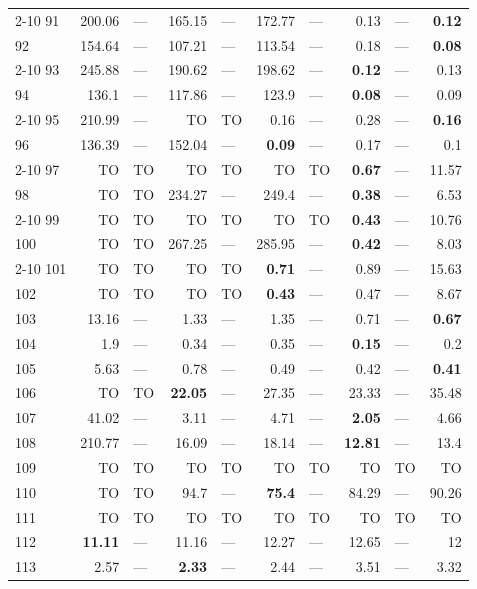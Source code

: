 \begin{longtable}{lr@{\hskip 4pt}l@{\hskip 12pt}r@{\hskip 4pt}l@{\hskip 12pt}r@{\hskip 4pt}l@{\hskip 12pt}r@{\hskip 4pt}l@{\hskip 12pt}r}
\cmidrule{2-10}
91 & 200.06 & --- & 165.15 & --- & 172.77 & --- & 0.13 & --- & \textbf{0.12} \\
92 & 154.64 & --- & 107.21 & --- & 113.54 & --- & 0.18 & --- & \textbf{0.08} \\
\cmidrule{2-10}
93 & 245.88 & --- & 190.62 & --- & 198.62 & --- & \textbf{0.12} & --- & 0.13 \\
94 & 136.1 & --- & 117.86 & --- & 123.9 & --- & \textbf{0.08} & --- & 0.09 \\
\cmidrule{2-10}
95 & 210.99 & --- & TO & TO & 0.16 & --- & 0.28 & --- & \textbf{0.16} \\
96 & 136.39 & --- & 152.04 & --- & \textbf{0.09} & --- & 0.17 & --- & 0.1 \\
\cmidrule{2-10}
97 & TO & TO & TO & TO & TO & TO & \textbf{0.67} & --- & 11.57 \\
98 & TO & TO & 234.27 & --- & 249.4 & --- & \textbf{0.38} & --- & 6.53 \\
\cmidrule{2-10}
99 & TO & TO & TO & TO & TO & TO & \textbf{0.43} & --- & 10.76 \\
100 & TO & TO & 267.25 & --- & 285.95 & --- & \textbf{0.42} & --- & 8.03 \\
\cmidrule{2-10}
101 & TO & TO & TO & TO & \textbf{0.71} & --- & 0.89 & --- & 15.63 \\
102 & TO & TO & TO & TO & \textbf{0.43} & --- & 0.47 & --- & 8.67 \\
\midrule
103 & 13.16 & --- & 1.33 & --- & 1.35 & --- & 0.71 & --- & \textbf{0.67} \\
104 & 1.9 & --- & 0.34 & --- & 0.35 & --- & \textbf{0.15} & --- & 0.2 \\
105 & 5.63 & --- & 0.78 & --- & 0.49 & --- & 0.42 & --- & \textbf{0.41} \\
106 & TO & TO & \textbf{22.05} & --- & 27.35 & --- & 23.33 & --- & 35.48 \\
107 & 41.02 & --- & 3.11 & --- & 4.71 & --- & \textbf{2.05} & --- & 4.66 \\
108 & 210.77 & --- & 16.09 & --- & 18.14 & --- & \textbf{12.81} & --- & 13.4 \\
109 & TO & TO & TO & TO & TO & TO & TO & TO & TO \\
110 & TO & TO & 94.7 & --- & \textbf{75.4} & --- & 84.29 & --- & 90.26 \\
111 & TO & TO & TO & TO & TO & TO & TO & TO & TO \\
112 & \textbf{11.11} & --- & 11.16 & --- & 12.27 & --- & 12.65 & --- & 12 \\
113 & 2.57 & --- & \textbf{2.33} & --- & 2.44 & --- & 3.51 & --- & 3.32 \\

\end{longtable}
